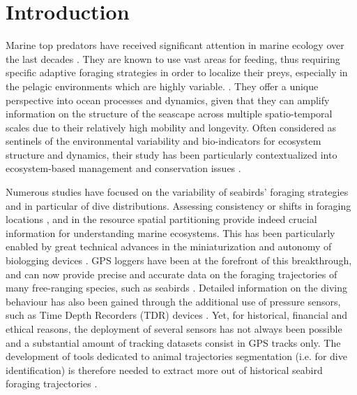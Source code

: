 \documentclass{article}
\begin{document}
\newpage

\section{Introduction}
Marine top predators have received significant attention in marine ecology over the last decades \cite{authier_conservation_2017}. They are known to use vast areas for feeding, thus requiring specific adaptive foraging strategies in order to localize their preys, especially in the pelagic environments which are highly variable. \cite{hazen_marine_2019}. They offer a unique perspective into ocean processes and dynamics, given that they can amplify information on the structure of the seascape across multiple spatio-temporal scales due to their relatively high mobility and longevity. Often considered as sentinels of the environmental variability and bio-indicators for ecosystem structure and dynamics, their study has been particularly contextualized into ecosystem-based management and conservation issues \cite{lascelles_migratory_2014, hooker_marine_2004}.

Numerous studies have focused on the variability of seabirds' foraging strategies and in particular of dive distributions. Assessing consistency or shifts in foraging locations \cite{bost_large-scale_2015,meier_consistent_2015-1,oppel_seasonal_2017}, and in the resource spatial partitioning  \cite{kappes_variability_2011,bolton_review_2019} provide indeed crucial information for understanding marine ecosystems. This has been particularly enabled by great technical advances in the miniaturization and autonomy of biologging devices \cite{ropert-coudert_diving_2009,chung_review_2021}. GPS loggers have been at the forefront of this breakthrough, and can now provide precise and accurate data on the foraging trajectories of many free-ranging species, such as seabirds \cite{wakefield_quantifying_2009,yoda_advances_2019}. Detailed information on the diving behaviour has also been gained through the additional use of pressure sensors, such as Time Depth Recorders (TDR) devices \cite{cox_seabird_2016,lewis_flexible_2004,shoji_foraging_2015}. Yet, for historical, financial and ethical reasons, the deployment of several sensors has not always been possible and a substantial amount of tracking datasets consist in GPS tracks only. The development of tools dedicated to animal trajectories segmentation (i.e. for dive identification) is therefore needed to extract more out of historical seabird foraging trajectories \cite{browning_predicting_2018}.
\end{document}
